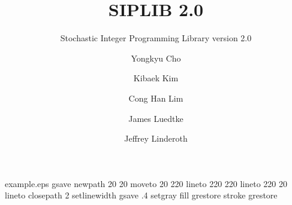 %
%
%
%
%
\begin{filecontents*}{example.eps}
gsave
newpath
  20 20 moveto
  20 220 lineto
  220 220 lineto
  220 20 lineto
closepath
2 setlinewidth
gsave
  .4 setgray fill
grestore
stroke
grestore
\end{filecontents*}
%
\RequirePackage{fix-cm}
%
\documentclass[smallextended]{svjour3}       %
%
\smartqed  %
%
\usepackage{graphicx}
\usepackage{hyperref}
\usepackage{float}
\usepackage{mathrsfs,amsmath,amssymb,amscd,mathtools}
%
%
%
%
%


\title{SIPLIB 2.0
}
\subtitle{Stochastic Integer Programming Library version 2.0}


\author{Yongkyu Cho \and 
		Kibaek Kim \and
        Cong Han Lim \and
        James Luedtke \and
        Jeffrey Linderoth
}


